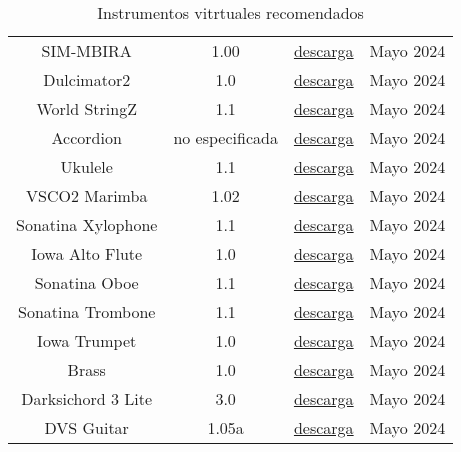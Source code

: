 \begin{table}[h]
\begin{tabular}{c|c|c|c}
            SIM-MBIRA  & 1.00 & \href{https://plugins4free.com/plugin/3669/}{descarga} & Mayo 2024\\
            
            Dulcimator2  & 1.0 & \href{https://plugins4free.com/plugin/3688/}{descarga} & Mayo 2024\\
            
            World StringZ  & 1.1 & \href{https://plugins4free.com/plugin/1085/}{descarga} & Mayo 2024\\
            
            Accordion  & no especificada & \href{https://plugins4free.com/plugin/302/}{descarga} & Mayo 2024\\
            
            Ukulele  & 1.1 & \href{https://plugins4free.com/plugin/1841/}{descarga} & Mayo 2024\\
            
            VSCO2 Marimba  & 1.02 & \href{https://plugins4free.com/plugin/2723/}{descarga} & Mayo 2024\\
            
            Sonatina Xylophone  & 1.1 & \href{https://plugins4free.com/plugin/2332/}{descarga} & Mayo 2024\\
            
            Iowa Alto Flute  & 1.0 & \href{https://plugins4free.com/plugin/2327/}{descarga} & Mayo 2024\\

            Sonatina Oboe  & 1.1 & \href{https://plugins4free.com/plugin/2314/}{descarga} & Mayo 2024\\

            Sonatina Trombone  & 1.1 & \href{https://plugins4free.com/plugin/2306/}{descarga} & Mayo 2024\\

            Iowa Trumpet  & 1.0 & \href{https://plugins4free.com/plugin/2421/}{descarga} & Mayo 2024\\
            
            Brass  & 1.0 & \href{https://plugins4free.com/plugin/186/}{descarga} & Mayo 2024\\
            
            Darksichord 3 Lite  & 3.0 & \href{https://electroniksoundlab.com/darksichord-3-lite/}{descarga} & Mayo 2024\\
            
            DVS Guitar  & 1.05a & \href{https://plugins4free.com/plugin/192/}{descarga} & Mayo 2024\\
            
		\hline
	\end{tabular}
	\caption{Instrumentos vitrtuales recomendados}
	\label{tab:instrumentos-virtuales-recomendados-1}
\end{table}

